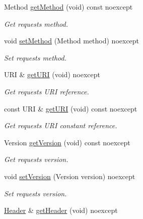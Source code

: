 \begin{DoxyCompactItemize}
Method \mbox{\hyperlink{classo_z_1_1o_z_1_1_h_t_t_p_1_1_request_a62b4363c50c0319a7a2e537d05f550cb}{get\+Method}} (void) const noexcept
\begin{DoxyCompactList}\small\item\em Get request\textquotesingle{}s method. \end{DoxyCompactList}\item 
void \mbox{\hyperlink{classo_z_1_1o_z_1_1_h_t_t_p_1_1_request_a5657aa20edabc241f3877f8937522e4a}{set\+Method}} (Method method) noexcept
\begin{DoxyCompactList}\small\item\em Set request\textquotesingle{}s method. \end{DoxyCompactList}\item 
U\+RI \& \mbox{\hyperlink{classo_z_1_1o_z_1_1_h_t_t_p_1_1_request_ac249876629da986ddf1418885657f802}{get\+U\+RI}} (void) noexcept
\begin{DoxyCompactList}\small\item\em Get request\textquotesingle{}s U\+RI reference. \end{DoxyCompactList}\item 
const U\+RI \& \mbox{\hyperlink{classo_z_1_1o_z_1_1_h_t_t_p_1_1_request_a31dd803fc89a2c39651abd7612d11300}{get\+U\+RI}} (void) const noexcept
\begin{DoxyCompactList}\small\item\em Get request\textquotesingle{}s U\+RI constant reference. \end{DoxyCompactList}\item 
Version \mbox{\hyperlink{classo_z_1_1o_z_1_1_h_t_t_p_1_1_request_ab7224cf669a39fe5385351728ce25797}{get\+Version}} (void) const noexcept
\begin{DoxyCompactList}\small\item\em Get request\textquotesingle{}s version. \end{DoxyCompactList}\item 
void \mbox{\hyperlink{classo_z_1_1o_z_1_1_h_t_t_p_1_1_request_a1678781402c85346e87000fe154338ad}{set\+Version}} (Version version) noexcept
\begin{DoxyCompactList}\small\item\em Set request\textquotesingle{}s version. \end{DoxyCompactList}\item 
\mbox{\hyperlink{classo_z_1_1o_z_1_1_h_t_t_p_1_1_header}{Header}} \& \mbox{\hyperlink{classo_z_1_1o_z_1_1_h_t_t_p_1_1_request_acdf258d4e597e670186b8758932d8a1f}{get\+Header}} (void) noexcept

\end{DoxyCompactItemize}

